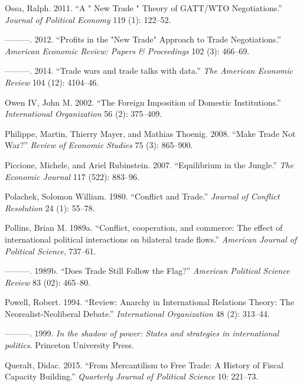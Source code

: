 \documentclass{puthesis}
\newlength{\cslhangindent}
\newenvironment{cslreferences}%
  {\setlength{\parindent}{0pt}%
  \everypar{\setlength{\hangindent}{\cslhangindent}}\ignorespaces}%
  {\par}
\begin{document}
\begin{cslreferences}
\leavevmode\hypertarget{ref-Ossa2011}{}%
Ossa, Ralph. 2011. ``A " New Trade " Theory of GATT/WTO Negotiations.''
\emph{Journal of Political Economy} 119 (1): 122--52.

\leavevmode\hypertarget{ref-Ossa2012}{}%
---------. 2012. ``Profits in the "New Trade" Approach to Trade
Negotiations.'' \emph{American Economic Review: Papers \& Proceedings}
102 (3): 466--69.

\leavevmode\hypertarget{ref-Ossa2014}{}%
---------. 2014. ``Trade wars and trade talks with data.'' \emph{The
American Economic Review} 104 (12): 4104--46.

\leavevmode\hypertarget{ref-Owen2002}{}%
Owen IV, John M. 2002. ``The Foreign Imposition of Domestic
Institutions.'' \emph{International Organization} 56 (2): 375--409.

\leavevmode\hypertarget{ref-Philippe2008}{}%
Philippe, Martin, Thierry Mayer, and Mathias Thoenig. 2008. ``Make Trade
Not War?'' \emph{Review of Economic Studies} 75 (3): 865--900.

\leavevmode\hypertarget{ref-Piccione2007}{}%
Piccione, Michele, and Ariel Rubinstein. 2007. ``Equilibrium in the
Jungle.'' \emph{The Economic Journal} 117 (522): 883--96.

\leavevmode\hypertarget{ref-Polachek1980}{}%
Polachek, Solomon William. 1980. ``Conflict and Trade.'' \emph{Journal
of Conflict Resolution} 24 (1): 55--78.

\leavevmode\hypertarget{ref-Pollins1989b}{}%
Pollins, Brian M. 1989a. ``Conflict, cooperation, and commerce: The
effect of international political interactions on bilateral trade
flows.'' \emph{American Journal of Political Science}, 737--61.

\leavevmode\hypertarget{ref-Pollins1989a}{}%
---------. 1989b. ``Does Trade Still Follow the Flag?'' \emph{American
Political Science Review} 83 (02): 465--80.

\leavevmode\hypertarget{ref-Powell1994}{}%
Powell, Robert. 1994. ``Review: Anarchy in International Relations
Theory: The Neorealist-Neoliberal Debate.'' \emph{International
Organization} 48 (2): 313--44.

\leavevmode\hypertarget{ref-Powell1999}{}%
---------. 1999. \emph{In the shadow of power: States and strategies in
international politics}. Princeton University Press.

\leavevmode\hypertarget{ref-Queralt2015}{}%
Queralt, Didac. 2015. ``From Mercantilism to Free Trade: A History of
Fiscal Capacity Building.'' \emph{Quarterly Journal of Political
Science} 10: 221--73.


\end{cslreferences}
\end{document}
